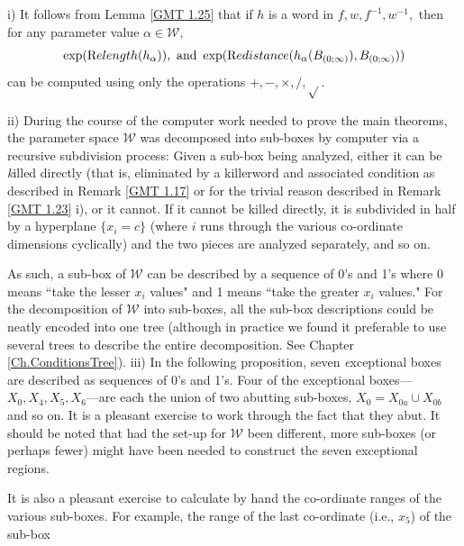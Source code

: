 \begin{remark}\label{GMT 1.26} i)  It follows from Lemma \ref{GMT 1.25} that if $h$ is a word in $f,w,f^{-1},w^{-1},$ then for any
parameter value $\alpha\in \mathcal {W},$
$$\exp({\textrm Relength}(h_\alpha)), \hbox{ and }
  \exp({\textrm Redistance}(h_\alpha(B_{(0;\infty)}), B_{(0;\infty)}))$$ can be computed using only the
operations $+, -, \times, /, \sqrt{}.$

 ii) During the course of the computer work needed to prove the main theorems, the parameter space
$\mathcal {W}$ was decomposed into sub-boxes by computer via a recursive subdivision process:
Given a sub-box  being analyzed, either it can be {\textit killed directly} (that is, eliminated by a killerword and associated condition as described in
Remark \ref{GMT 1.17}
or for the trivial reason described in Remark \ref{GMT 1.23} i), or it cannot.  
If it cannot be killed directly, it is subdivided in half by a hyperplane
$\{x_i = c \}$ (where $i$ runs through the various co-ordinate dimensions
cyclically) and the two pieces are analyzed separately, and so on. 

As such, a sub-box of $\mathcal {W}$ can be described by a sequence of 0's and 1's where 0 means ``take the lesser $x_i$ values" and 1 means ``take the greater $x_i$ values."  
For the decomposition of $\mathcal {W}$ into sub-boxes, all the 
sub-box descriptions could be neatly encoded into one tree (although in practice we found it preferable to use several trees to describe the entire
	decomposition.  See Chapter \ref{Ch.ConditionsTree}).
iii) In the following proposition, seven {\textit exceptional boxes} are described as sequences of 0's and 1's.  
Four of the exceptional boxes---$X_0, X_4, X_5, X_6$---are each the union of two abutting sub-boxes, $X_0 = X_{0a} \cup X_{0b}$ and so on.  It is a pleasant exercise to work through the fact that they abut.  
It should be noted that had the set-up for $\mathcal {W}$ been different, more sub-boxes (or perhaps fewer) might have been needed to construct the seven
exceptional regions. 

It is also a pleasant exercise to calculate by hand the co-ordinate ranges of the various sub-boxes.  For example, the range of the last co-ordinate (i.e., $x_5$) of the sub-box 
\eject


\end{remark}
